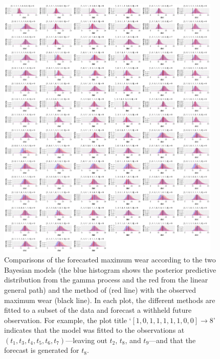 \begin{figure}[tbp]
  \centering
  \includegraphics[width=0.95\textwidth]{figures/ch-6/test.png}
  \caption{Comparisons of the forecasted maximum wear according to the two Bayesian models (the blue histogram shows the posterior predictive distribution from the gamma process and the red from the linear general path) and the method of \citet{webb_2020} (red line) with the observed maximum wear (black line). In each plot, the different methods are fitted to a subset of the data and forecast a withheld future observation. For example, the plot title `$[1, 0, 1, 1, 1, 1, 1, 0, 0] \rightarrow 8$' indicates that the model was fitted to the observations at $(t_1, t_3, t_4, t_5, t_6, t_7)$---leaving out $t_2$, $t_8$, and $t_9$---and that the forecast is generated for $t_8$.}
  \label{fig:beltwear-resampling}
\end{figure}

